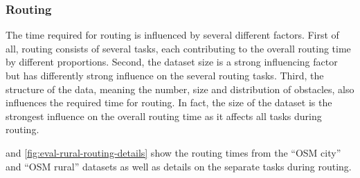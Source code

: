 		\subsubsection{Routing}
		
			The time required for routing is influenced by several different factors.
			First of all, routing consists of several tasks, each contributing to the overall routing time by different proportions.
			Second, the dataset size is a strong influencing factor but has differently strong influence on the several routing tasks.
			Third, the structure of the data, meaning the number, size and distribution of obstacles, also influences the required time for routing.
			In fact, the size of the dataset is the strongest influence on the overall routing time as it affects all tasks during routing.
			
			 and \ref{fig:eval-rural-routing-details} show the routing times from the \enquote{OSM city} and \enquote{OSM rural} datasets as well as details on the separate tasks during routing.
		
